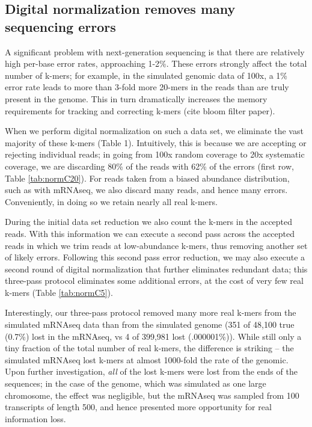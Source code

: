 \documentclass[10pt,draft]{article}
\begin{document}
\subsection*{Digital normalization removes many sequencing errors}

A significant problem with next-generation sequencing is that there
are relatively high per-base error rates, approaching 1-2\%.  These
errors strongly affect the total number of k-mers; for example, in the
simulated genomic data of 100x, a 1\% error rate leads to more than
3-fold more 20-mers in the reads than are truly present in the genome.
This in turn dramatically increases the memory requirements for
tracking and correcting k-mers (cite bloom filter paper).

When we perform digital normalization on such a data set, we eliminate
the vast majority of these k-mers (Table 1).  Intuitively, this is
because we are accepting or rejecting individual reads; in going from
100x random coverage to 20x systematic coverage, we are discarding
80\% of the reads with 62\% of the errors (first row, Table \ref{tab:normC20}).
For reads taken from a biased abundance distribution, such as with
mRNAseq, we also discard many reads, and hence many errors.
Conveniently, in doing so we retain nearly all real k-mers.

During the initial data set reduction we also count the k-mers in the
accepted reads.  With this information we can execute a second pass
across the accepted reads in which we trim reads at low-abundance
k-mers, thus removing another set of likely errors.  Following this
second pass error reduction, we may also execute a second round of
digital normalization that further eliminates redundant data; this
three-pass protocol eliminates some additional errors, at the cost
of very few real k-mers (Table \ref{tab:normC5}).

Interestingly, our three-pass protocol removed many more real k-mers
from the simulated mRNAseq data than from the simulated genome (351 of
48,100 true (0.7\%) lost in the mRNAseq, vs 4 of 399,981 lost
(.000001\%)).  While still only a tiny fraction of the total number of
real k-mers, the difference is striking -- the simulated mRNAseq lost
k-mers at almost 1000-fold the rate of the genomic.  Upon further
investigation, {\em all} of the lost k-mers were lost from the ends
of the sequences; in the case of the genome, which was simulated as
one large chromosome, the effect was negligible, but the mRNAseq
was sampled from 100 transcripts of length 500, and hence presented
more opportunity for real information loss.
\end{document}
